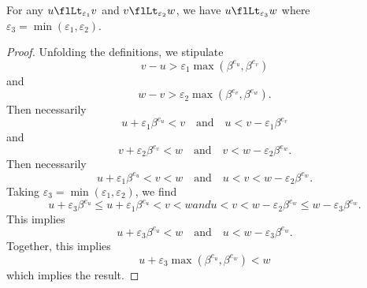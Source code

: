 \begin{thm}
  For any $u\flLt_{\varepsilon_{1}}v$ and $v\flLt_{\varepsilon_{2}}w$,
  we have $u\flLt_{\varepsilon_{3}}w$ where $\varepsilon_{3}=\min(\varepsilon_{1},\varepsilon_{2})$.
\end{thm}
\begin{proof}
  Unfolding the definitions, we stipulate
  \begin{equation}
    v - u > \varepsilon_{1}\max(\beta^{e_{u}},\beta^{e_{v}})
  \end{equation}
  and
  \begin{equation}
    w - v > \varepsilon_{2}\max(\beta^{e_{v}},\beta^{e_{w}}).
  \end{equation}
  Then necessarily
  \begin{equation}
    u + \varepsilon_{1}\beta^{e_{u}} < v
    \quad\mbox{and}\quad
    u < v - \varepsilon_{1}\beta^{e_{v}} 
  \end{equation}
  and
  \begin{equation}
    v + \varepsilon_{2}\beta^{e_{v}} < w
    \quad\mbox{and}\quad
    v < w - \varepsilon_{2}\beta^{e_{w}}.
  \end{equation}
  Then necessarily
  \begin{equation}
    u + \varepsilon_{1}\beta^{e_{u}} < v < w
    \quad\mbox{and}\quad
    u < v < w - \varepsilon_{2}\beta^{e_{w}}.
  \end{equation}
  Taking $\varepsilon_{3}=\min(\varepsilon_{1},\varepsilon_{2})$, we
  find
  \begin{subequations}
  \begin{equation}
    u + \varepsilon_{3}\beta^{e_{u}} \leq 
    u + \varepsilon_{1}\beta^{e_{u}} < v < w
  \end{equation}
  and
  \begin{equation}
    u < v < w - \varepsilon_{2}\beta^{e_{w}}
    \leq w - \varepsilon_{3}\beta^{e_{w}}.
  \end{equation}
  \end{subequations}
  This implies
  \begin{equation}
    u + \varepsilon_{3}\beta^{e_{u}} < w
    \quad\mbox{and}\quad
    u < w - \varepsilon_{3}\beta^{e_{w}}.
  \end{equation}
  Together, this implies
  \begin{equation}
    u + \varepsilon_{3}\max(\beta^{e_{u}}, \beta^{e_{w}}) < w
  \end{equation}
  which implies the result.
\end{proof}


